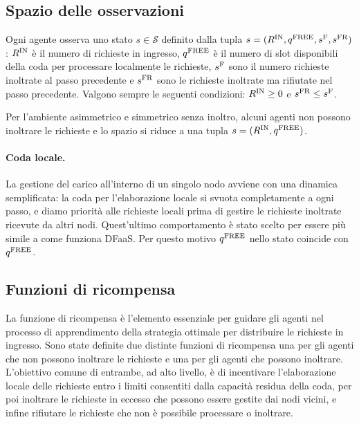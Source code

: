 \subsection{Spazio delle osservazioni}

Ogni agente osserva uno stato $s \in \mathcal{S}$ definito dalla tupla $s = (R^\textnormal{IN}, q^\textnormal{FREE}, s^\textnormal{F}, s^\textnormal{FR})$: $R^\textnormal{IN}$ è il numero di richieste in ingresso, $q^\textnormal{FREE}$ è il numero di slot disponibili della coda per processare localmente le richieste, $s^\textnormal{F}$ sono il numero richieste inoltrate al passo precedente e $s^\textnormal{FR}$ sono le richieste inoltrate ma rifiutate nel passo precedente. Valgono sempre le seguenti condizioni: $R^\textnormal{IN} \ge 0$ e $s^\textnormal{FR} \le s^\textnormal{F}$.

Per l'ambiente asimmetrico e simmetrico senza inoltro, alcuni agenti non possono inoltrare le richieste e lo spazio si riduce a una tupla $s = (R^\textnormal{IN}, q^\textnormal{FREE})$.

\paragraph{Coda locale.} La gestione del carico all'interno di un singolo nodo avviene con una dinamica semplificata: la coda per l'elaborazione locale si svuota completamente a ogni passo, e diamo priorità alle richieste locali prima di gestire le richieste inoltrate ricevute da altri nodi. Quest'ultimo comportamento è stato scelto per essere più simile a come funziona DFaaS. Per questo motivo $q^\textnormal{FREE}$ nello stato coincide con $q^\textnormal{FREE}$. 

\subsection{Funzioni di ricompensa}
\label{sec:4_funzione_ricompensa}

La funzione di ricompensa è l'elemento essenziale per guidare gli agenti nel processo di apprendimento della strategia ottimale per distribuire le richieste in ingresso. Sono state definite due distinte funzioni di ricompensa una per gli agenti che non possono inoltrare le richieste e una per gli agenti che possono inoltrare. L'obiettivo comune di entrambe, ad alto livello, è di incentivare l'elaborazione locale delle richieste entro i limiti consentiti dalla capacità residua della coda, per poi inoltrare le richieste in eccesso che possono essere gestite dai nodi vicini, e infine rifiutare le richieste che non è possibile processare o inoltrare.

